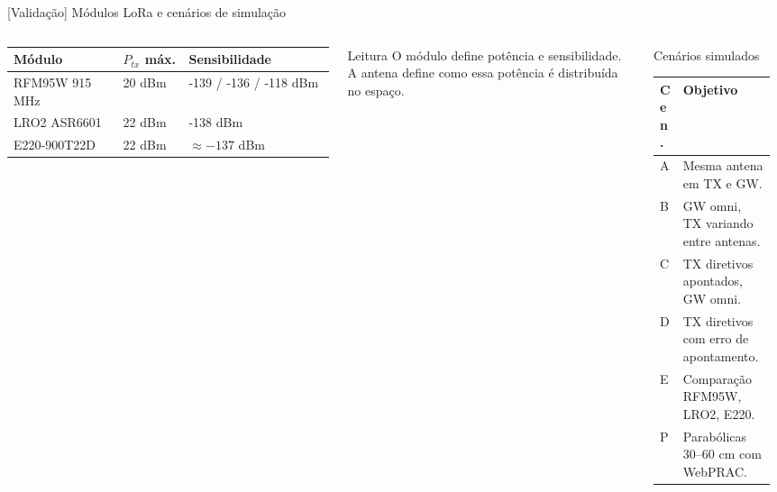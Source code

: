 \documentclass[aspectratio=169]{beamer}
\begin{document}
\begin{frame}{[Validação] Módulos LoRa e cenários de simulação}
\small
\begin{columns}[T,onlytextwidth]
\scriptsize
\begin{tabular}{p{0.30\linewidth}p{0.18\linewidth}p{0.40\linewidth}}
\toprule
Módulo & $P_{tx}$ máx. & Sensibilidade \\
\midrule
RFM95W 915 MHz & 20 dBm & -139 / -136 / -118 dBm \\
LRO2 ASR6601 & 22 dBm & -138 dBm \\
E220-900T22D & 22 dBm & $\approx -137$ dBm \\
\bottomrule
\end{tabular}
\vspace{0.4em}
\begin{block}{Leitura}
O módulo define potência e sensibilidade. A antena define como essa potência é distribuída no espaço.
\end{block}

\begin{block}{Cenários simulados}
\scriptsize
\begin{tabular}{p{0.10\linewidth}p{0.80\linewidth}}
\toprule
Cen. & Objetivo \\
\midrule
A & Mesma antena em TX e GW. \\
B & GW omni, TX variando entre antenas. \\
C & TX diretivos apontados, GW omni. \\
D & TX diretivos com erro de apontamento. \\
E & Comparação RFM95W, LRO2, E220. \\
P & Parabólicas 30–60 cm com WebPRAC. \\
\bottomrule
\end{tabular}
\end{block}
\end{columns}
\end{frame}

\end{document}
